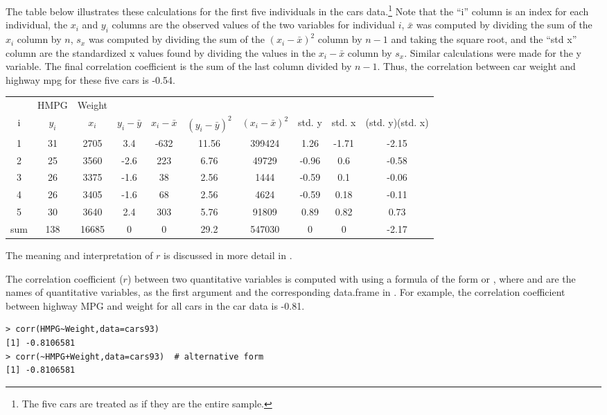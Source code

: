 \documentclass[10pt,openany]{book}\usepackage[]{graphicx}\usepackage[]{color}
\makeatletter
\newenvironment{kframe}{%
 \def\at@end@of@kframe{}%
 \ifinner\ifhmode%
  \def\at@end@of@kframe{\end{minipage}}%
  \begin{minipage}{\columnwidth}%
 \fi\fi%
 \def\FrameCommand##1{\hskip\@totalleftmargin \hskip-\fboxsep
 \colorbox{shadecolor}{##1}\hskip-\fboxsep
     \hskip-\linewidth \hskip-\@totalleftmargin \hskip\columnwidth}%
 \MakeFramed {\advance\hsize-\width
   \@totalleftmargin\z@ \linewidth\hsize
   \@setminipage}}%
 {\par\unskip\endMakeFramed%
 \at@end@of@kframe}
\newenvironment{knitrout}{}{} %
\makeatother
\begin{document}
The table below illustrates these calculations for the first five individuals in the cars data.\footnote{The five cars are treated as if they are the entire sample.} Note that the ``i'' column is an index for each individual, the $x_{i}$ and $y_{i}$ columns are the observed values of the two variables for individual $i$, $\bar{x}$ was computed by dividing the sum of the $x_{i}$ column by $n$, $s_{x}$ was computed by dividing the sum of the $(x_{i}-\bar{x})^{2}$ column by $n-1$ and taking the square root, and the ``std x'' column are the standardized x values found by dividing the values in the $x_{i}-\bar{x}$ column by $s_{x}$. Similar calculations were made for the y variable. The final correlation coefficient is the sum of the last column divided by $n-1$. Thus, the correlation between car weight and highway mpg for these five cars is -0.54.

\begin{center}
  \begin{tabular}{cccccccccc}
\hline\hline
 & HMPG & Weight & & & & & & & \\
i & $y_{i}$ & $x_{i}$ & $y_{i}-\bar{y}$ & $x_{i}-\bar{x}$ & $(y_{i}-\bar{y})^{2}$ & $(x_{i}-\bar{x})^{2}$ & std. y & std. x & (std. y)(std. x) \\
\hline
1 & 31 & 2705 &  3.4 & -632 & 11.56 & 399424 &  1.26 & -1.71 & -2.15 \\
2 & 25 & 3560 & -2.6 &  223 &  6.76 &  49729 & -0.96 &  0.6  & -0.58 \\
3 & 26 & 3375 & -1.6 &   38 &  2.56 &   1444 & -0.59 &  0.1  & -0.06 \\
4 & 26 & 3405 & -1.6 &   68 &  2.56 &   4624 & -0.59 &  0.18 & -0.11 \\
5 & 30 & 3640 &  2.4 &  303 &  5.76 &  91809 &  0.89 &  0.82 &  0.73 \\
\hline
sum & 138 & 16685 & 0 & 0 & 29.2 & 547030 & 0 & 0 &  -2.17 \\
\hline\hline
  \end{tabular}
\end{center}

The meaning and interpretation of $r$ is discussed in more detail in .

The correlation coefficient ($r$) between two quantitative variables is computed with  using a formula of the form  or , where  and  are the names of quantitative variables, as the first argument and the corresponding data.frame in . For example, the correlation coefficient between highway MPG and weight for all cars in the car data is -0.81.
\begin{knitrout}
\color{fgcolor}\begin{kframe}
\begin{verbatim}
> corr(HMPG~Weight,data=cars93)
[1] -0.8106581
> corr(~HMPG+Weight,data=cars93)  # alternative form
[1] -0.8106581
\end{verbatim}
\end{kframe}
\end{knitrout}
\end{document}
